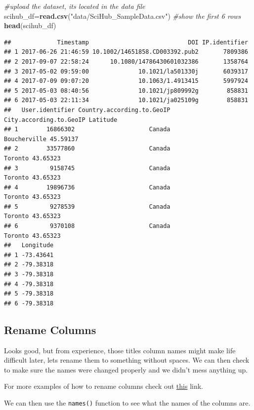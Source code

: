 \documentclass[
]{article}
\newenvironment{Shaded}{\begin{snugshade}}{\end{snugshade}}
\newcommand{\CommentTok}[1]{\textcolor[rgb]{0.56,0.35,0.01}{\textit{#1}}}
\newcommand{\FunctionTok}[1]{\textcolor[rgb]{0.13,0.29,0.53}{\textbf{#1}}}
\newcommand{\NormalTok}[1]{#1}
\newcommand{\OtherTok}[1]{\textcolor[rgb]{0.56,0.35,0.01}{#1}}
\newcommand{\StringTok}[1]{\textcolor[rgb]{0.31,0.60,0.02}{#1}}
\begin{document}
\begin{Shaded}
\begin{Highlighting}[]
\CommentTok{\#upload the dataset, its located in the data file}
\NormalTok{scihub\_df}\OtherTok{=}\FunctionTok{read.csv}\NormalTok{(}\StringTok{"data/SciHub\_SampleData.csv"}\NormalTok{) }
\CommentTok{\#show the first 6 rows}
\FunctionTok{head}\NormalTok{(scihub\_df) }
\end{Highlighting}
\end{Shaded}

\begin{verbatim}
##             Timestamp                            DOI IP.identifier
## 1 2017-06-26 21:46:59 10.1002/14651858.CD003392.pub2       7809386
## 2 2017-09-07 22:58:24      10.1080/14786430601032386       1358764
## 3 2017-05-02 09:59:00              10.1021/la501330j       6039317
## 4 2017-07-09 09:07:20              10.1063/1.4913415       5997924
## 5 2017-05-03 08:40:56              10.1021/jp809992g        858831
## 6 2017-05-03 22:11:34              10.1021/ja025109g        858831
##   User.identifier Country.according.to.GeoIP City.according.to.GeoIP Latitude
## 1        16866302                     Canada            Boucherville 45.59137
## 2        33577860                     Canada                 Toronto 43.65323
## 3         9158745                     Canada                 Toronto 43.65323
## 4        19896736                     Canada                 Toronto 43.65323
## 5         9278539                     Canada                 Toronto 43.65323
## 6         9370108                     Canada                 Toronto 43.65323
##   Longitude
## 1 -73.43641
## 2 -79.38318
## 3 -79.38318
## 4 -79.38318
## 5 -79.38318
## 6 -79.38318
\end{verbatim}

\subsection{Rename Columns}\label{rename-columns}

Looks good, but from experience, those titles column names might make
life difficult later, lets rename them to something without spaces. We
can then check to make sure the names were changed properly and we
didn't mess anything up.

For more examples of how to rename columns check out
\href{https://sparkbyexamples.com/r-programming/rename-column-in-r/}{this}
link.

We can then use the \texttt{names()} function to see what the names of
the columns are.
\end{document}
